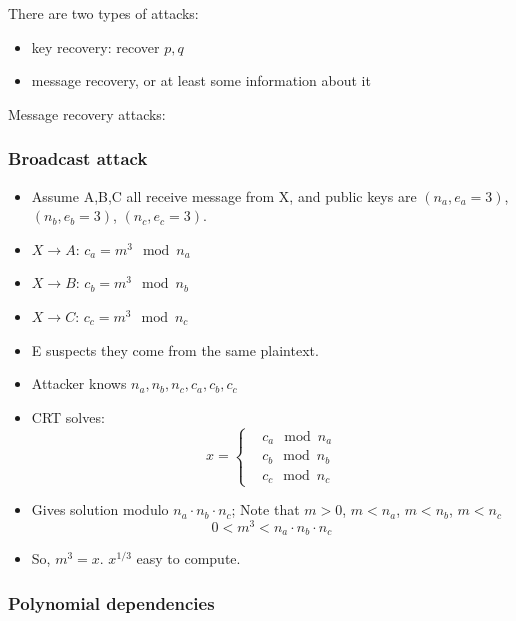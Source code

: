 \documentclass[language=english,number=]{homework}
\begin{document}
    There are two types of attacks:
    \begin{itemize}
        \item key recovery: recover $p,q$
        \item message recovery, or at least some information about it
    \end{itemize}

    Message recovery attacks:

    \subsubsection{Broadcast attack}

    \begin{itemize}
        \item Assume A,B,C all receive message from X, and public keys are $(n_a,e_a=3)$, $(n_b,e_b=3)$, $(n_c,e_c=3)$.
        \item $X \to A$: $c_a = m^3 \mod n_a$
        \item $X \to B$: $c_b = m^3 \mod n_b$
        \item $X \to C$: $c_c = m^3 \mod n_c$
        \item E suspects they come from the same plaintext.
        \item Attacker knows $n_a, n_b, n_c, c_a, c_b, c_c$
        \item CRT solves:
        \[
            x = \begin{cases}
                &c_a \mod n_a \\
                    &c_b \mod n_b \\
                    &c_c \mod n_c
            \end{cases}
        \]
        \item Gives solution modulo $n_a \cdot n_b \cdot n_c$;
        Note that $m > 0$, $m < n_a$, $m < n_b$, $m < n_c$
        \[
            0 < m^3 < n_a \cdot n_b \cdot n_c
        \]
        \item So, $m^3 = x$.
        $x^{1/3}$ easy to compute.
    \end{itemize}

    \subsubsection{Polynomial dependencies}
\end{document}
